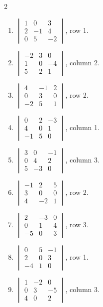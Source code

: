 \begin{multicols}{2}\raggedright
\begin{enumerate}[label=\arabic*.,  leftmargin=*]
\item $\begin{vmatrix}1&0&3\\2&-1&4\\0&5&-2\end{vmatrix}$, \quad row 1.
\item $\begin{vmatrix}-2&3&0\\1&0&-4\\5&2&1\end{vmatrix}$, \quad column 2.
\item $\begin{vmatrix}4&-1&2\\0&3&0\\-2&5&1\end{vmatrix}$, \quad row 2.
\item $\begin{vmatrix}0&2&-3\\4&0&1\\-1&5&0\end{vmatrix}$, \quad column 1.
\item $\begin{vmatrix}3&0&-1\\0&4&2\\5&-3&0\end{vmatrix}$, \quad column 3.
\item $\begin{vmatrix}-1&2&5\\3&0&0\\4&-2&1\end{vmatrix}$, \quad row 2.
\item $\begin{vmatrix}2&-3&0\\0&1&4\\-5&0&3\end{vmatrix}$, \quad row 3.
\item $\begin{vmatrix}0&5&-1\\2&0&3\\-4&1&0\end{vmatrix}$, \quad row 1.
\item $\begin{vmatrix}1&-2&0\\0&3&-5\\4&0&2\end{vmatrix}$, \quad column 3.

\end{enumerate}
\end{multicols}
